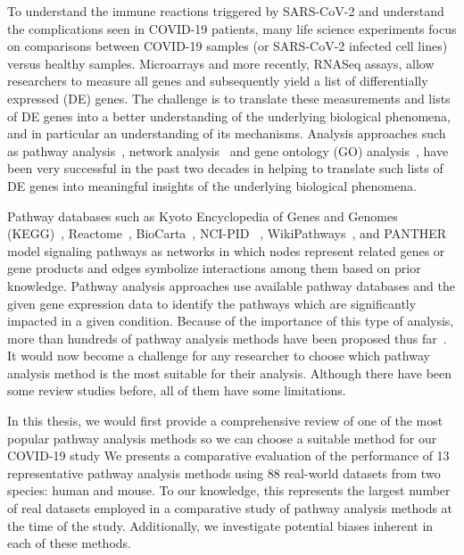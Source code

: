 To understand the immune reactions triggered by SARS-CoV-2 and understand the complications seen in COVID-19 patients, many life science experiments focus on comparisons between COVID-19 samples (or SARS-CoV-2 infected cell lines) versus healthy samples.
Microarrays and more recently, RNASeq assays, allow researchers to measure all genes and subsequently  yield a list of differentially expressed (DE) genes.
The challenge is to translate these measurements and lists of DE genes into a better understanding of the underlying biological phenomena, and in particular an understanding of its mechanisms. Analysis approaches such as pathway analysis~\cite{DraghiciOntologicalToolsReview:2005,Khatri:2012, mitrea2013methods, tarca2013comparison, nguyen2018network, ihnatova2018critical, nguyen2019identifying}, network analysis~\cite{mitra2013integrative} and gene ontology (GO) analysis~\cite{DraghiciOntologicalToolsReview:2005,Rhee:2008}, have been very successful in the past two decades in helping to translate such lists of DE genes into meaningful insights of the underlying biological phenomena. 

Pathway databases such as Kyoto Encyclopedia of Genes and Genomes (KEGG)~\cite{Kanehisa:2000}, Reactome~\cite{croft2014reactome}, BioCarta~\cite{BioCartaWWW}, NCI-PID ~\cite{Schaefer:2009}, WikiPathways~\cite{pico2008wikipathways}, and PANTHER~\cite{thomas2003panther} model signaling pathways as networks in which nodes represent related genes or gene products and edges symbolize interactions among them based on prior knowledge. 
Pathway analysis approaches use available pathway databases and the given gene expression data to identify the pathways which are significantly impacted in a given condition. 
Because of the importance of this type of analysis, more than hundreds of pathway analysis methods have been proposed thus far~\cite{DraghiciOntologicalToolsReview:2005,Khatri:2002,mitrea2013methods}.
It would now become a challenge for any researcher to choose which pathway analysis method is the most suitable for their analysis. 
Although there have been some review studies before, all of them have some limitations.

In this thesis, we would first provide a comprehensive review of one of the most popular pathway analysis methods so we can choose a suitable method for our COVID-19 study
We presents a comparative evaluation of the performance of 13 representative pathway analysis methods using 88 real-world datasets from two species: human and mouse. To our knowledge, this represents the largest number of real datasets employed in a comparative study of pathway analysis methods at the time of the study. Additionally, we investigate potential biases inherent in each of these methods.

